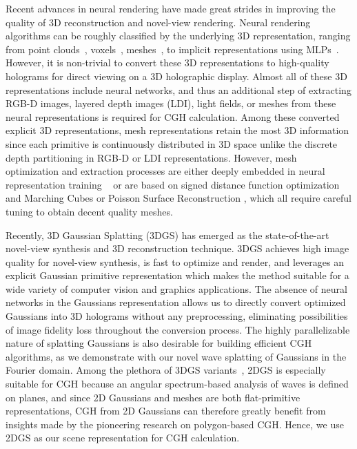 Recent advances in neural rendering \cite{tewari2022advances} have made great strides in improving the quality of 3D reconstruction and novel-view rendering. 
Neural rendering algorithms can be roughly classified by the underlying 3D representation, ranging from point clouds~\cite{KPLD21point, aliev2019point, xu2022point}, voxels~\cite{sitzmann2019deepvoxels,yu_and_fridovichkeil2021plenoxels, hu2023multiscale, yu2021plenoctrees}, meshes~\cite{neumesh, kato2018meshrenderer, Lombardi2018deepappearance, hu2021worldsheet, guo2023vmesh}, to implicit representations using MLPs~\cite{mildenhall2020nerf, mueller2022instant, sitzmann2019srns,sitzmann2020implicit}. However, it is non-trivial to convert these 3D representations to high-quality holograms for direct viewing on a 3D holographic display. Almost all of these 3D representations include neural networks, and thus an additional step of extracting RGB-D images, layered depth images (LDI), light fields, or meshes from these neural representations is required for CGH calculation. Among these converted explicit 3D representations, mesh representations retain the most 3D information since each primitive is continuously distributed in 3D space unlike the discrete depth partitioning in RGB-D or LDI representations. However, mesh optimization and extraction processes are either deeply embedded in neural representation training ~\cite{tang2022nerf2mesh, hanocka2020point2mesh} or are based on signed distance function optimization ~\cite{wang2021neus, yariv2021volume} and Marching Cubes \cite{marchingcubes} or Poisson Surface Reconstruction \cite{kazhdan2006poisson}, which all require careful tuning to obtain decent quality meshes.

Recently, 3D Gaussian Splatting \cite{kerbl3Dgaussians} (3DGS) has emerged as the state-of-the-art novel-view synthesis and 3D reconstruction technique. 
3DGS achieves high image quality for novel-view synthesis, is fast to optimize and render, and leverages an explicit Gaussian primitive representation which makes the method suitable for a wide variety of computer vision and graphics applications. The absence of neural networks in the Gaussians representation allows us to directly convert optimized Gaussians into 3D holograms without any preprocessing, eliminating possibilities of image fidelity loss throughout the conversion process. The highly parallelizable nature of splatting Gaussians is also desirable for building efficient CGH algorithms, as we demonstrate with our novel wave splatting of Gaussians in the Fourier domain. Among the plethora of 3DGS variants~\cite{chen2024survey}, 2DGS \cite{huang20242d} is especially suitable for CGH because an angular spectrum-based analysis of waves is defined on planes, and since 2D Gaussians and meshes are both flat-primitive representations, CGH from 2D Gaussians can therefore greatly benefit from insights made by the pioneering research on polygon-based CGH. Hence, we use 2DGS as our scene representation for CGH calculation.

